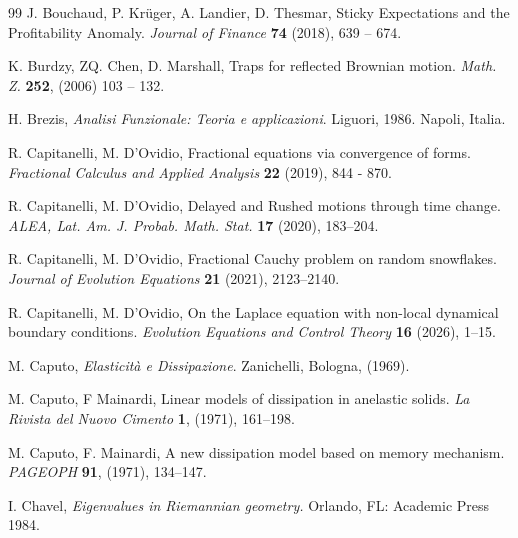 \documentclass[11pt,a4paper]{article}
\newcommand{\magenta}{black}
\begin{document}
\begin{thebibliography}{99}
J. Bouchaud, P. Kr\"{u}ger, A. Landier, D. Thesmar, 
Sticky Expectations and the Profitability Anomaly. 
\textit{Journal of Finance} {\bf 74} (2018), 639 -- 674.


K. Burdzy, ZQ. Chen, D. Marshall, 
Traps for reflected Brownian motion. 
\textit{Math. Z.} {\bf 252}, (2006) 103 -- 132.

H. Brezis,
\emph{Analisi Funzionale: Teoria e applicazioni}. Liguori, 1986. Napoli, Italia.

%

R. Capitanelli, M. D'Ovidio,
Fractional equations via convergence of forms.
\textit{Fractional Calculus and Applied Analysis} {\bf 22} (2019), 844 - 870.

%
R. Capitanelli, M. D'Ovidio,
Delayed and Rushed motions through time change.
\textit{ALEA, Lat. Am. J. Probab. Math. Stat.} {\bf 17} (2020), 183--204.

R. Capitanelli, M. D'Ovidio,
Fractional Cauchy problem on random snowflakes.
\textit{Journal of Evolution Equations} {\bf 21} (2021), 2123--2140.

{\color{\magenta}
R. Capitanelli, M. D'Ovidio,
On the Laplace equation with non-local dynamical boundary conditions.
\textit{Evolution Equations and Control Theory} {\bf 16} (2026), 1--15.
}


M. Caputo, 
\textit{Elasticit\`{a} e Dissipazione}. Zanichelli, Bologna, (1969).

M. Caputo, F Mainardi,
Linear models of dissipation in anelastic solids.
\textit{La Rivista del Nuovo Cimento} \textbf{1}, (1971), 161--198.

M. Caputo, F. Mainardi,
A new dissipation model based on memory mechanism. 
\textit{PAGEOPH} \textbf{91}, (1971), 134--147.


I. Chavel,
\emph{Eigenvalues in Riemannian geometry.} 
Orlando, FL: Academic Press 1984.





\end{thebibliography}
\end{document}
